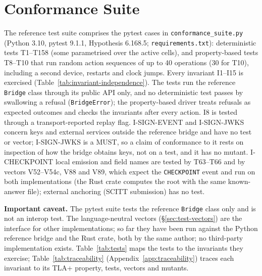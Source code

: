 \section{Conformance Suite}
\label{sec:conformance}

The reference test suite comprises the pytest cases in
\texttt{conformance\_suite.py} (Python 3.10, pytest 9.1.1, Hypothesis
6.168.5; \texttt{requirements.txt}): deterministic tests T1--T158 (some
parametrised over the active cells), and property-based tests
T8--T10 that run random action sequences of up to 40 operations (30 for T10), %
including a second device, restarts and clock jumps. Every invariant
I1--I15 is exercised (Table~\ref{tab:invariant-independence}). The tests
run the reference \texttt{Bridge} class through its public API only, and
no deterministic test passes by swallowing a refusal
(\texttt{BridgeError}); the property-based driver treats refusals as
expected outcomes and checks the invariants after every action. I8 is
tested through a transport-reported replay flag. I-SIGN-EVENT and
I-SIGN-JWKS concern keys and external services outside the reference
bridge and have no test or vector; I-SIGN-JWKS is a MUST, so a claim
of conformance to it rests on inspection of how the bridge obtains
keys, not on a test, and it has no mutant. I-CHECKPOINT local emission
and field names are tested by T63--T66 and by vectors V52--V54c, V88 and
V89, which expect the \texttt{CHECKPOINT} event and run on both
implementations (the Rust crate computes the root with the same
known-answer file); external anchoring (SCITT submission) has no test.

\textbf{Important caveat.} The pytest suite tests the
reference \texttt{Bridge} class only and is not an interop test. The
language-neutral vectors (\S\ref{sec:test-vectors}) are the interface for
other implementations; so far they have been run against the Python reference bridge
and the Rust crate, both by the same author; no third-party implementation exists.
Table~\ref{tab:tests} maps the tests to the invariants they exercise;
Table~\ref{tab:traceability} (Appendix~\ref{app:traceability}) traces each
invariant to its TLA+ property, tests, vectors and mutants.



